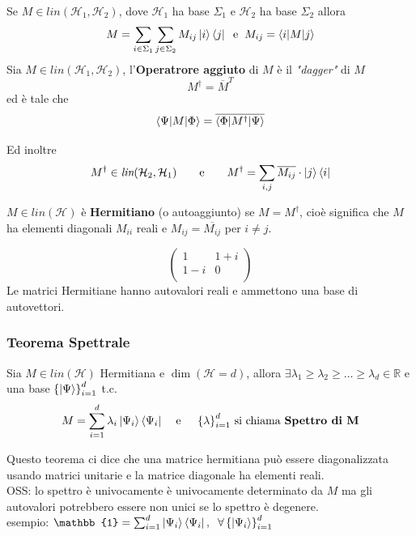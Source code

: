\documentclass{report}
\begin{document}
Se $M\in \textit{lin}(\mathcal{H}_1,\mathcal{H}_2)$, dove $\mathcal{H}_1$ ha base $\Sigma_1$ e  $\mathcal{H}_2$ ha base $\Sigma_2$ allora 
$$M = \sum_{i \in \Sigma_1}\sum_{j \in \Sigma_2} M_{ij} \ket{i}\bra{j}\hspace{0.2cm} \text{e} \hspace{0.2cm} M_{ij} = \braket{i|M|j}$$
Sia  $M\in \textit{lin}(\mathcal{H}_1,\mathcal{H}_2)$, l'\textbf{Operatrore aggiuto} di $M$ è il \textit{"dagger"} di $M$
$$M^\dagger = \overline{M}^T$$
ed è tale che $$\braket{\Psi|M|\Phi} = \overline{\braket{\Phi|M^\dagger|\Psi}}$$

Ed inoltre
$$M^\dagger\in \textit{lin}(\mathcal{H}_2,\mathcal{H}_1) \qquad \text{e} \qquad M^\dagger = \sum_{i,j} \overline{M_{ij}} \cdot\ket{j}\bra{i}$$

$M\in \textit{lin}(\mathcal{H})$ è \textbf{Hermitiano} (o autoaggiunto) se $M = M^\dagger$, cioè significa che $M$ ha elementi diagonali $M_{ii}$ reali e $M_{ij} = \overline{M_{ij}}$ per $i\neq j$.

$$\begin{pmatrix}
    1 & 1+i \\
    1-i & 0\\
\end{pmatrix}$$
Le matrici Hermitiane hanno autovalori reali e ammettono una base di autovettori.
\subsubsection{Teorema Spettrale}
Sia $M\in \textit{lin}(\mathcal{H})$ Hermitiana e $\dim (\mathcal{H} = d)$, allora 
$\exists \lambda_1\ge\lambda_2\ge\dots\ge \lambda_d \in \mathbb{R}$ e una base $\left\{\ket{\Psi}\right\} ^d_{i=1} $ t.c.
$$M = \sum^d_{i=1}\lambda_i \ket{\Psi_i}\bra{\Psi_i}\hspace{0.4cm} \text{e\hspace{0.4cm} $\left\{ \lambda\right\} ^d_{i=1} $ si chiama \textbf{Spettro di M}}$$

Questo teorema ci dice che una matrice hermitiana può essere diagonalizzata usando matrici unitarie e la matrice diagonale ha elementi reali.
\medskip
\\OSS: lo spettro è univocamente è univocamente determinato da $M$ ma gli autovalori potrebbero essere non unici se lo spettro è degenere.
\\esempio: $\mathbb{1} = \sum^d_{i=1}\ket{\Psi_i}\bra{\Psi_i}, \hspace{0.2cm} \forall \left\{ \ket{\Psi_i}\right\} ^d_{i=1}$ 
\end{document}
